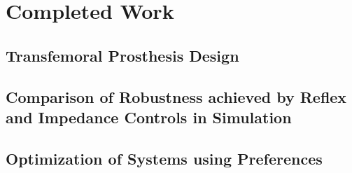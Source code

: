 \chapter{Completed Work}

\section{Transfemoral Prosthesis Design}
\section{Comparison of Robustness achieved by Reflex and Impedance Controls in Simulation}
\section{Optimization of Systems using Preferences}
